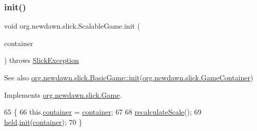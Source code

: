 \subsubsection{\texorpdfstring{init()}{init()}}
{\footnotesize\ttfamily void org.\+newdawn.\+slick.\+Scalable\+Game.\+init (\begin{DoxyParamCaption}\item[{\mbox{\hyperlink{classorg_1_1newdawn_1_1slick_1_1_game_container}{Game\+Container}}}]{container }\end{DoxyParamCaption}) throws \mbox{\hyperlink{classorg_1_1newdawn_1_1slick_1_1_slick_exception}{Slick\+Exception}}\hspace{0.3cm}{\ttfamily [inline]}}

\begin{DoxySeeAlso}{See also}
\mbox{\hyperlink{classorg_1_1newdawn_1_1slick_1_1_basic_game_a8af0900217e4d389249f71367b22d114}{org.\+newdawn.\+slick.\+Basic\+Game\+::init}}(\mbox{\hyperlink{classorg_1_1newdawn_1_1slick_1_1_game_container}{org.\+newdawn.\+slick.\+Game\+Container}}) 
\end{DoxySeeAlso}


Implements \mbox{\hyperlink{interfaceorg_1_1newdawn_1_1slick_1_1_game_ad2dd6affab08bb8fdb5fab0815957b7a}{org.\+newdawn.\+slick.\+Game}}.


\begin{DoxyCode}
65                                                                     \{
66         this.\mbox{\hyperlink{classorg_1_1newdawn_1_1slick_1_1_scalable_game_ae8df04372ae01e645445bc4a22f58c7c}{container}} = \mbox{\hyperlink{classorg_1_1newdawn_1_1slick_1_1_scalable_game_ae8df04372ae01e645445bc4a22f58c7c}{container}};
67         
68         \mbox{\hyperlink{classorg_1_1newdawn_1_1slick_1_1_scalable_game_abb55f95f659cbab0f9ac35b73ff16187}{recalculateScale}}();
69         \mbox{\hyperlink{classorg_1_1newdawn_1_1slick_1_1_scalable_game_a9f1fb24a0827c8d6619e682e6239a475}{held}}.\mbox{\hyperlink{interfaceorg_1_1newdawn_1_1slick_1_1_game_ad2dd6affab08bb8fdb5fab0815957b7a}{init}}(\mbox{\hyperlink{classorg_1_1newdawn_1_1slick_1_1_scalable_game_ae8df04372ae01e645445bc4a22f58c7c}{container}});
70     \}
\end{DoxyCode}
\mbox{\label{classorg_1_1newdawn_1_1slick_1_1_scalable_game_abb55f95f659cbab0f9ac35b73ff16187}} 
